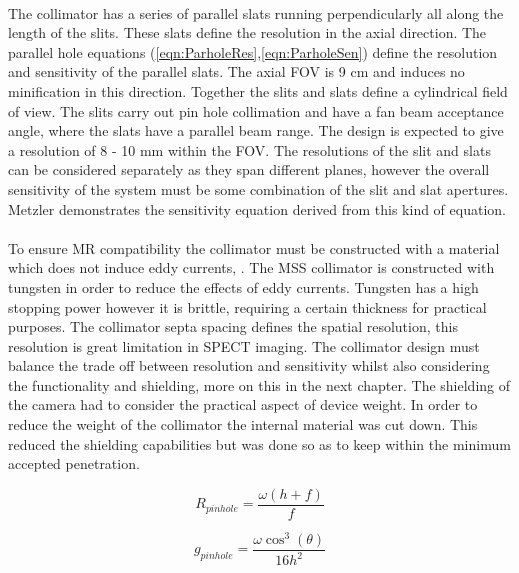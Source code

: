 \paragraph{}
The collimator has a series of parallel slats running perpendicularly all along the length of the slits. These slats define the resolution in the axial direction. The parallel hole equations (\ref{eqn:ParholeRes},\ref{eqn:ParholeSen}) define the resolution and sensitivity of the parallel slats. The axial FOV is 9 cm and induces no minification in this direction. Together the slits and slats define a cylindrical field of view. The slits carry out pin hole collimation and have a fan beam acceptance angle, where the slats have a parallel beam range. The design is expected to give a resolution of 8 - 10 mm within the FOV. The resolutions of the slit and slats can be considered separately  as they span different planes, however the overall sensitivity of the system must be some combination of the slit and slat apertures. Metzler \cite{Metzler2010SlitSlatAM} demonstrates the sensitivity equation derived from this kind of equation.
\paragraph{} 
To ensure MR compatibility the collimator must be constructed with a material which does not induce eddy currents, \cite{7286864}. The MSS collimator is constructed with tungsten in order to reduce the effects of eddy currents. Tungsten has a high stopping power however it is brittle, requiring a certain thickness for practical purposes. The collimator septa spacing defines the spatial resolution, this resolution is great limitation in SPECT imaging. The collimator design must balance the trade off between resolution and sensitivity whilst also considering the functionality and shielding, more on this in the next chapter. The shielding of the camera had to consider the practical aspect of device weight. In order to reduce the weight of the collimator the internal material was cut down. This reduced the shielding capabilities but was done so as to keep within the minimum accepted penetration. 


\begin{equation} \label{eqn:pinholeRes}
        R_{pinhole} = \frac{\omega(h + f)}{f}
\end{equation}


\begin{equation} \label{eqn:pinholeSen}
        g_{pinhole} = \frac{\omega \cos^{3}(\theta)}{16h^{2}}
\end{equation}

